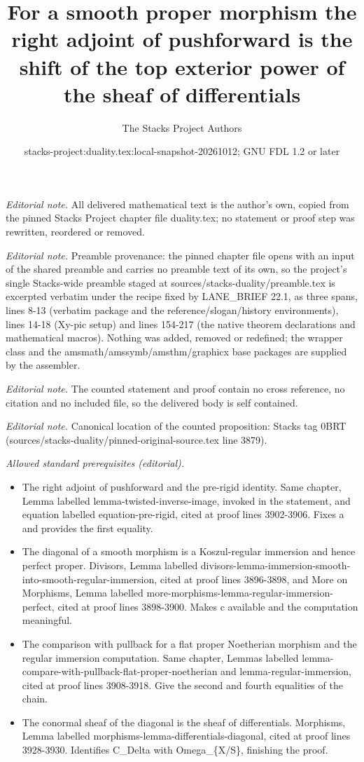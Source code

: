 \documentclass[10pt,a4paper]{amsart}
\title{For a smooth proper morphism the right adjoint of pushforward is the shift of the top exterior power of the sheaf of differentials}
\author{The Stacks Project Authors}
\date{stacks-project:duality.tex:local-snapshot-20261012; GNU FDL 1.2 or later}
\theoremstyle{plain}
\theoremstyle{definition}
\theoremstyle{remark}
\numberwithin{equation}{subsection}
\begin{document}
\maketitle
\noindent\textit{Editorial note.} All delivered mathematical text is the author's own, copied from the pinned Stacks Project chapter file duality.tex; no statement or proof step was rewritten, reordered or removed.\par\medskip
\noindent\textit{Editorial note.} Preamble provenance: the pinned chapter file opens with an input of the shared preamble and carries no preamble text of its own, so the project's single Stacks-wide preamble staged at sources/stacks-duality/preamble.tex is excerpted verbatim under the recipe fixed by LANE\_BRIEF 22.1, as three spans, lines 8-13 (verbatim package and the reference/slogan/history environments), lines 14-18 (Xy-pic setup) and lines 154-217 (the native theorem declarations and mathematical macros). Nothing was added, removed or redefined; the wrapper class and the amsmath/amssymb/amsthm/graphicx base packages are supplied by the assembler.\par\medskip
\noindent\textit{Editorial note.} The counted statement and proof contain no cross reference, no citation and no included file, so the delivered body is self contained.\par\medskip
\noindent\textit{Editorial note.} Canonical location of the counted proposition: Stacks tag 0BRT (sources/stacks-duality/pinned-original-source.tex line 3879).\par\medskip
\noindent\textit{Allowed standard prerequisites (editorial).}\begin{itemize}
\item The right adjoint of pushforward and the pre-rigid identity. Same chapter, Lemma labelled lemma-twisted-inverse-image, invoked in the statement, and equation labelled equation-pre-rigid, cited at proof lines 3902-3906. Fixes a and provides the first equality.
\item The diagonal of a smooth morphism is a Koszul-regular immersion and hence perfect proper. Divisors, Lemma labelled divisors-lemma-immersion-smooth-into-smooth-regular-immersion, cited at proof lines 3896-3898, and More on Morphisms, Lemma labelled more-morphisms-lemma-regular-immersion-perfect, cited at proof lines 3898-3900. Makes c available and the computation meaningful.
\item The comparison with pullback for a flat proper Noetherian morphism and the regular immersion computation. Same chapter, Lemmas labelled lemma-compare-with-pullback-flat-proper-noetherian and lemma-regular-immersion, cited at proof lines 3908-3918. Give the second and fourth equalities of the chain.
\item The conormal sheaf of the diagonal is the sheaf of differentials. Morphisms, Lemma labelled morphisms-lemma-differentials-diagonal, cited at proof lines 3928-3930. Identifies C\_Delta with Omega\_\{X/S\}, finishing the proof.
\end{itemize}\medskip
\end{document}
